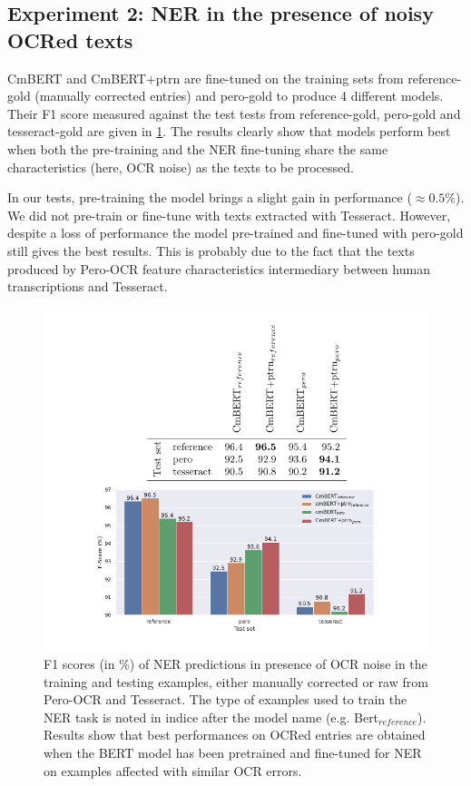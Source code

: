 \subsection{Experiment 2: NER in the presence of noisy OCRed texts}
CmBERT and CmBERT+ptrn are fine-tuned on the training sets from reference-gold (manually corrected entries) and pero-gold to produce 4 different models.
Their F1 score measured against the test tests from reference-gold, pero-gold and tesseract-gold are given in \cref{fig:exp_2_eval_ner}.
The results clearly show that models perform best when both the pre-training and the NER fine-tuning share the same characteristics (here, OCR noise) as the texts to be processed.

In our tests, pre-training the model brings a slight gain in performance ($\approx 0.5\%$).
We did not pre-train or fine-tune with texts extracted with Tesseract.
However, despite a loss of performance the model pre-trained and fine-tuned with pero-gold still gives the best results.
This is probably due to the fact that the texts produced by Pero-OCR feature characteristics intermediary between human transcriptions and Tesseract.

\begin{figure}
    \centering
    \includegraphics[width=\textwidth]{figs/eval-ner-exp2.pdf}
    \caption{F1 scores (in \%) of NER predictions in presence of OCR noise in the training and testing examples, either manually corrected or raw from Pero-OCR and Tesseract. The type of examples used to train the NER task is noted in indice after the model name (e.g. Bert$_{reference}$). Results show that best performances on OCRed entries are obtained when the BERT model has been pretrained and fine-tuned for NER on examples affected with similar OCR errors.}
    \label{fig:exp_2_eval_ner}
\end{figure}


